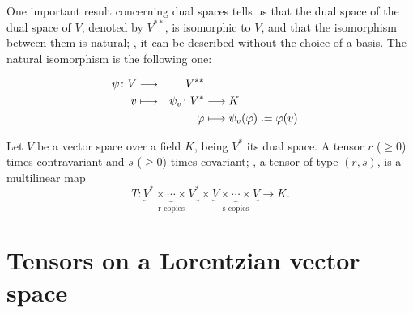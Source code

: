 One important result concerning dual spaces tells us that the dual space of the dual space of $V$, denoted by $V^{**}$, is isomorphic to $V$, and that the isomorphism between them is natural; \ie, it can be described without the choice of a basis. The natural isomorphism is the following one:

\begin{alignat*}{2}
	\psi \colon V &\longrightarrow& V^{**} \\
	v &\longmapsto& \psi_v \colon V^* &\longrightarrow K \\
	&&\varphi &\longmapsto \psi_v(\varphi) \defeq \varphi(v)
\end{alignat*}

\begin{definition}
	Let $V$ be a vector space over a field $K$, being $V^*$ its dual space. A tensor $r$ ($\geq 0$) times contravariant and $s$ ($\geq 0$) times covariant; \ie, a tensor of type $(r,s)$, is a multilinear map
	\[
		T \colon \underbrace{V^* \times \cdots \times V^*}_{\text{r copies}} \times \underbrace{V \times \cdots \times V}_{\text{s copies}} \longrightarrow K.
	\]
\end{definition}



\section{Tensors on a Lorentzian vector space}

